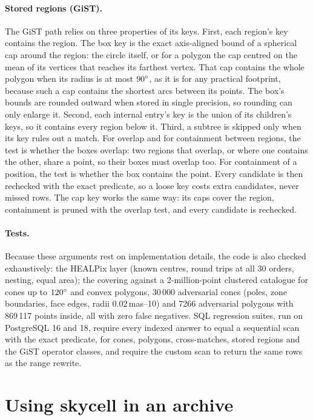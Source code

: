 \paragraph{Stored regions (GiST).} The GiST path relies on three properties of its
keys. First, each region's key contains the region. The box key is the exact
axis-aligned bound of a spherical cap around the region: the circle itself, or for a
polygon the cap centred on the mean of its vertices that reaches its farthest vertex.
That cap contains the whole polygon when its radius is at most $90^{\circ}$, as it is for
any practical footprint, because such a cap contains the shortest arcs between its
points. The box's bounds are rounded outward when stored in single precision, so
rounding can only enlarge it. Second, each internal entry's key is the union of its
children's keys, so it contains every region below it. Third, a subtree is skipped only
when its key rules out a match. For overlap and for containment between regions, the
test is whether the boxes overlap: two regions that overlap, or where one contains the
other, share a point, so their boxes must overlap too. For containment of a position,
the test is whether the box contains the point. Every candidate is then rechecked with
the exact predicate, so a loose key costs extra candidates, never missed rows. The cap
key works the same way: its caps cover the region, containment is pruned with the
overlap test, and every candidate is rechecked.

\paragraph{Tests.} Because these arguments rest on implementation details, the code is
also checked exhaustively: the HEALPix layer (known centres, round trips at all 30
orders, nesting, equal area); the covering against a 2-million-point clustered catalogue
for cones up to $120^{\circ}$ and convex polygons, 30\,000 adversarial cones (poles, zone
boundaries, face edges, radii 0.02\,mas--10\degr) and 7266 adversarial polygons with
869\,117 points inside, all with zero false negatives. SQL regression suites, run on
PostgreSQL 16 and 18, require every indexed answer to equal a sequential scan with the
exact predicate, for cones, polygons, cross-matches, stored regions and the GiST
operator classes, and require the custom scan to return the same rows as the range
rewrite.

\section{Using skycell in an archive}
\label{sec:adql}

